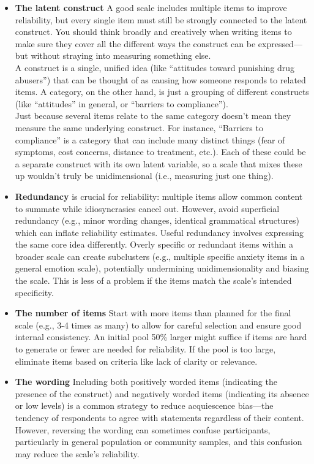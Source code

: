 \documentclass[
  letterpaper,
  DIV=11,
  numbers=noendperiod]{scrartcl}
\begin{document}
\begin{itemize}
\item
  \textbf{The latent construct} A good scale includes multiple items to
  improve reliability, but every single item must still be strongly
  connected to the latent construct. You should think broadly and
  creatively when writing items to make sure they cover all the
  different ways the construct can be expressed---but without straying
  into measuring something else.\\
  A construct is a single, unified idea (like ``attitudes toward
  punishing drug abusers'') that can be thought of as causing how
  someone responds to related items. A category, on the other hand, is
  just a grouping of different constructs (like ``attitudes'' in
  general, or ``barriers to compliance'').\\
  Just because several items relate to the same category doesn't mean
  they measure the same underlying construct. For instance, ``Barriers
  to compliance'' is a category that can include many distinct things
  (fear of symptoms, cost concerns, distance to treatment, etc.). Each
  of these could be a separate construct with its own latent variable,
  so a scale that mixes these up wouldn't truly be unidimensional (i.e.,
  measuring just one thing).
\item
  \textbf{Redundancy} is crucial for reliability: multiple items allow
  common content to summate while idiosyncrasies cancel out. However,
  avoid superficial redundancy (e.g., minor wording changes, identical
  grammatical structures) which can inflate reliability estimates.
  Useful redundancy involves expressing the same core idea differently.
  Overly specific or redundant items within a broader scale can create
  subclusters (e.g., multiple specific anxiety items in a general
  emotion scale), potentially undermining unidimensionality and biasing
  the scale. This is less of a problem if the items match the scale's
  intended specificity.
\item
  \textbf{The number of items} Start with more items than planned for
  the final scale (e.g., 3-4 times as many) to allow for careful
  selection and ensure good internal consistency. An initial pool 50\%
  larger might suffice if items are hard to generate or fewer are needed
  for reliability. If the pool is too large, eliminate items based on
  criteria like lack of clarity or relevance.
\item
  \textbf{The wording} Including both positively worded items
  (indicating the presence of the construct) and negatively worded items
  (indicating its absence or low levels) is a common strategy to reduce
  acquiescence bias---the tendency of respondents to agree with
  statements regardless of their content. However, reversing the wording
  can sometimes confuse participants, particularly in general population
  or community samples, and this confusion may reduce the scale's
  reliability.
\end{itemize}
\end{document}

